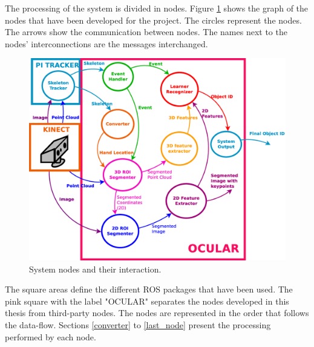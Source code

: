 The processing of the system is divided in nodes. 
Figure \ref{nodes_graph} shows the graph of the nodes that have been developed for the project.
The circles represent the nodes. %
The arrows show the communication between nodes. 
The names next to the nodes' interconnections are the messages interchanged.  %

\vspace{0.5cm}



	\vspace{0.5cm}
	\begin{figure}[H]
			\begin{center}
			\includegraphics[width=\linewidth]{img/diagrams/nodes.eps}
			\caption[System nodes]{System nodes and their interaction.}
			\label{nodes_graph}
			\end{center}
		\end{figure}

\vspace{0.5cm}


The square areas define the different ROS packages that have been used.
The pink square with the label "OCULAR" separates the nodes developed in this thesis from third-party nodes. 
The nodes are represented in the order that follows the data-flow. 
Sections \ref{converter} to \ref{last_node} present the processing performed by each node. 

